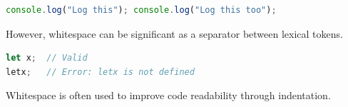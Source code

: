 \documentclass[a4paper,12pt]{article}
\begin{document}
\begin{lstlisting}[language=JavaScript, caption=Whitespace Insensitivity Example]
console.log("Log this"); console.log("Log this too");
\end{lstlisting}

However, whitespace can be significant as a separator between lexical tokens.

\begin{lstlisting}[language=JavaScript, caption=Whitespace as a Separator]
let x;  // Valid
letx;   // Error: letx is not defined
\end{lstlisting}

Whitespace is often used to improve code readability through indentation.
\end{document}
